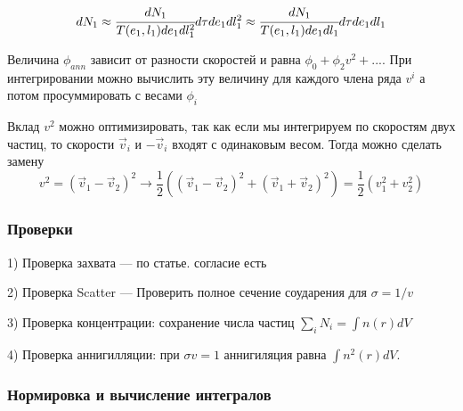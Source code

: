 	\begin{equation}
		dN_1 \approx \cfrac{dN_1}{T(e_1,l_1)de_1 dl_1^2} d\tau de_1 dl_1^2 \approx \cfrac{dN_1}{T(e_1,l_1)de_1 dl_1} d\tau de_1 dl_1 
	\end{equation}
	
	Величина $\phi_{ann}$ зависит от разности скоростей и равна $\phi_0 + \phi_2 v^2 +...$. При интегрировании можно вычислить эту величину для каждого члена ряда $v^i$ а потом просуммировать с весами $\phi_i$
	
	Вклад $v^2$ можно оптимизировать, так как если мы интегрируем по скоростям двух частиц, то скорости $\vec{v}_i$ и $-\vec{v}_i$ входят с одинаковым весом. Тогда можно сделать замену
	\begin{equation}
		v^2 = (\vec{v}_1-\vec{v}_2)^2 \rightarrow \frac{1}{2}\left(
			(\vec{v}_1-\vec{v}_2)^2 + 
			(\vec{v}_1+\vec{v}_2)^2
		\right) = \frac{1}{2}(v_1^2+v_2^2)
	\end{equation}
	
	\subsubsection{Проверки}
	1) Проверка захвата --- по статье. согласие есть
	
	2) Проверка Scatter --- Проверить полное сечение соударения для $\sigma = 1/v$
	
	3) Проверка концентрации: сохранение числа частиц $\sum_i{N_i} = \int{n(r)dV}$
	
	4) Проверка аннигилляции: при $\sigma v = 1$ аннигиляция равна $\int{n^2(r)dV}$.
	
	
	\subsubsection{Нормировка  и вычисление интегралов}
	
